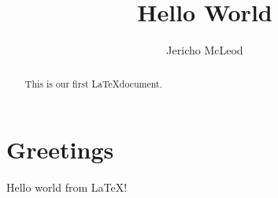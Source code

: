 \documentclass[11pt]{article}
\title{Hello World}
\author{Jericho McLeod}
\begin{document}
	\maketitle
	
	\begin{abstract}
		This is our first \LaTeX document.
	\end{abstract}

	\section{Greetings}
	Hello world from \LaTeX!
	
\end{document}
